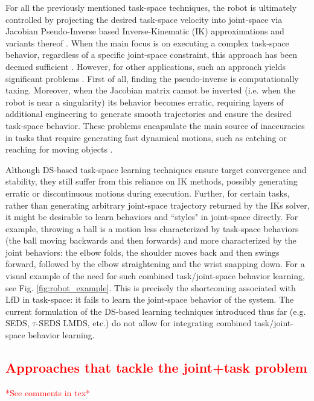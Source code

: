 \documentclass[letterpaper, 10 pt, conference,fleqn]{ieeeconf}
\begin{document}
For all the previously mentioned task-space techniques, the robot is ultimately controlled by projecting the desired task-space velocity into joint-space via Jacobian Pseudo-Inverse based Inverse-Kinematic (IK) approximations and variants thereof \cite{kelly2006control}. When the main focus is on executing a complex task-space behavior, regardless of a specific joint-space constraint, this approach has been deemed sufficient \cite{figueroa2016HRIrolling,ureche2015taskconst}. However, for other applications, such an approach yields significant problems \cite{buss2004introduction}. First of all, finding the pseudo-inverse is computationally taxing. Moreover, when the Jacobian matrix cannot be inverted (i.e. when the robot is near a singularity) its behavior becomes erratic, requiring layers of additional engineering to generate smooth trajectories and ensure the desired task-space behavior. These problems encapsulate the main source of inaccuracies in tasks that require generating fast dynamical motions, such as catching or reaching for moving objects \cite{7439839,Salehian-RSS-16}. 

Although DS-based task-space learning techniques ensure target convergence and stability, they still suffer from this reliance on IK methods, possibly generating erratic or discontinuous motions during execution. Further, for certain tasks, rather than generating arbitrary joint-space trajectory returned by the IKs solver, it might be desirable to learn behaviors and ``styles" in joint-space directly.  For example, throwing a ball is a motion less characterized by task-space behaviors (the ball moving backwards and then forwards) and more characterized by the joint behaviors: the elbow folds, the shoulder moves back and then swings forward, followed by the elbow straightening and the wrist snapping down. For a visual example of the need for such combined task/joint-space behavior learning, see Fig. \ref{fig:robot_example}. This is precisely the shortcoming associated with LfD in task-space: it fails to learn the joint-space behavior of the system. The current formulation of the DS-based learning techniques introduced thus far (e.g. SEDS, $\tau$-SEDS LMDS, etc.) do not allow for integrating combined task/joint-space behavior learning.


\subsection{\textcolor{red}{Approaches that tackle the joint+task problem}}
\textcolor{red}{*See comments in tex*}
%
%
\end{document}
